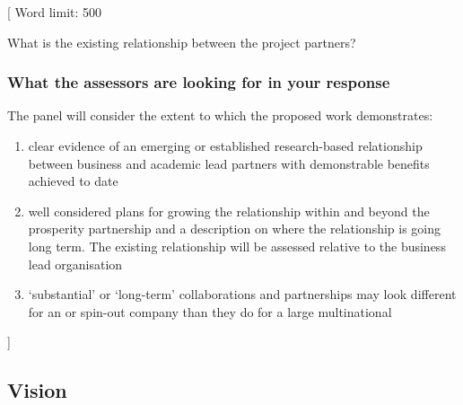 \documentclass{article}
\newcommand{\desc}[1]{{\leavevmode\color{blue}[#1]}}
\begin{document}
\desc{
Word limit: 500

What is the existing relationship between the project partners?

\subsubsection*{What the assessors are looking for in your response}

The panel will consider the extent to which the proposed work demonstrates:

\begin{enumerate}

    \item clear evidence of an emerging or established research-based
        relationship between business and academic lead partners with
        demonstrable benefits achieved to date

    \item well considered plans for growing the relationship within and beyond
        the prosperity partnership and a description on where the relationship
        is going long term. The existing relationship will be assessed relative
        to the business lead organisation

    \item ‘substantial’ or ‘long-term’ collaborations and partnerships may look
        different for an or spin-out company than they do for a large
        multinational

\end{enumerate}

}

% 

\subsection{Vision}
\end{document}

